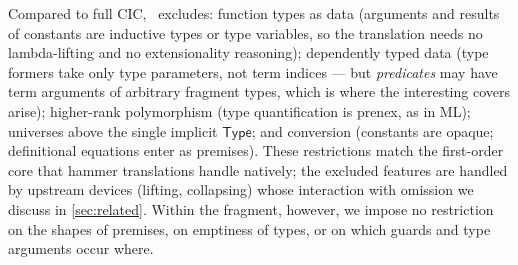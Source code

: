 \begin{remark}[Scope]
  \label{rem:scope}
  Compared to full CIC, \Frag\ excludes: function types as data (arguments
  and results of constants are inductive types or type variables, so the
  translation needs no lambda-lifting and no extensionality reasoning);
  dependently typed data (type formers take only type parameters, not term
  indices --- but \emph{predicates} may have term arguments of arbitrary
  fragment types, which is where the interesting covers arise);
  higher-rank polymorphism (type quantification is prenex, as in ML);
  universes above the single implicit $\mathsf{Type}$; and conversion
  (constants are opaque; definitional equations enter as premises).  These
  restrictions match the first-order core that hammer translations handle
  natively; the excluded features are handled by upstream devices
  (lifting, collapsing) whose interaction with omission we discuss in
  \cref{sec:related}.  Within the fragment, however, we impose no
  restriction on the shapes of premises, on emptiness of types, or on which
  guards and type arguments occur where.
\end{remark}
